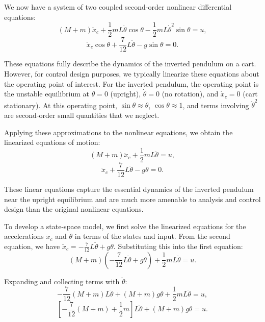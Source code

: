 We now have a system of two coupled second-order nonlinear differential equations:
\begin{equation}
(M + m)\ddot{x}_c + \frac{1}{2}mL\ddot{\theta}\cos\theta - \frac{1}{2}mL\dot{\theta}^2\sin\theta = u,
\end{equation}
\begin{equation}
\ddot{x}_c\cos\theta + \frac{7}{12}L\ddot{\theta} - g\sin\theta = 0.
\end{equation}

These equations fully describe the dynamics of the inverted pendulum on a cart. However, for control design purposes, we typically linearize these equations about the operating point of interest. For the inverted pendulum, the operating point is the unstable equilibrium at $\theta = 0$ (upright), $\dot{\theta} = 0$ (no rotation), and $\dot{x}_c = 0$ (cart stationary). At this operating point, $\sin\theta \approx \theta$, $\cos\theta \approx 1$, and terms involving $\dot{\theta}^2$ are second-order small quantities that we neglect.

Applying these approximations to the nonlinear equations, we obtain the linearized equations of motion:
\begin{equation}
(M + m)\ddot{x}_c + \frac{1}{2}mL\ddot{\theta} = u,
\end{equation}
\begin{equation}
\ddot{x}_c + \frac{7}{12}L\ddot{\theta} - g\theta = 0.
\end{equation}

These linear equations capture the essential dynamics of the inverted pendulum near the upright equilibrium and are much more amenable to analysis and control design than the original nonlinear equations.

To develop a state-space model, we first solve the linearized equations for the accelerations $\ddot{x}_c$ and $\ddot{\theta}$ in terms of the states and input. From the second equation, we have $\ddot{x}_c = - \frac{7}{12}L\ddot{\theta} + g\theta$. Substituting this into the first equation:
\begin{equation}
(M + m)\left(- \frac{7}{12}L\ddot{\theta} + g\theta\right) + \frac{1}{2}mL\ddot{\theta} = u.
\end{equation}

Expanding and collecting terms with $\ddot{\theta}$:
\begin{equation}
-\frac{7}{12}(M + m)L\ddot{\theta} + (M + m)g\theta + \frac{1}{2}mL\ddot{\theta} = u,
\end{equation}
\begin{equation}
\left[-\frac{7}{12}(M + m) + \frac{1}{2}m\right]L\ddot{\theta} + (M + m)g\theta = u.
\end{equation}

